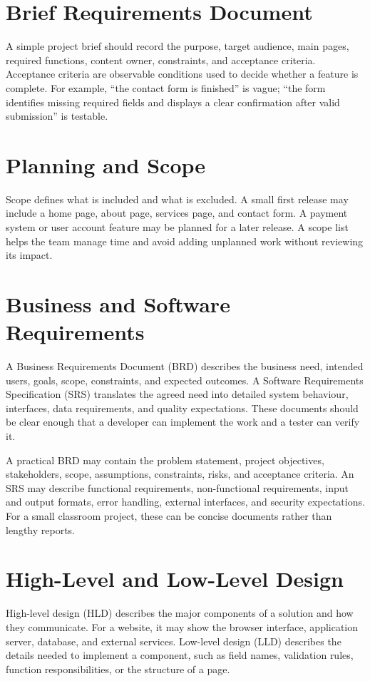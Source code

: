 \documentclass[11pt,openany,oneside]{book}
\begin{document}
\section{Brief Requirements Document}
A simple project brief should record the purpose, target audience, main pages, required functions, content owner, constraints, and acceptance criteria. Acceptance criteria are observable conditions used to decide whether a feature is complete. For example, “the contact form is finished” is vague; “the form identifies missing required fields and displays a clear confirmation after valid submission” is testable.

\section{Planning and Scope}
Scope defines what is included and what is excluded. A small first release may include a home page, about page, services page, and contact form. A payment system or user account feature may be planned for a later release. A scope list helps the team manage time and avoid adding unplanned work without reviewing its impact.


\section{Business and Software Requirements}
A Business Requirements Document (BRD) describes the business need, intended users, goals, scope, constraints, and expected outcomes. A Software Requirements Specification (SRS) translates the agreed need into detailed system behaviour, interfaces, data requirements, and quality expectations. These documents should be clear enough that a developer can implement the work and a tester can verify it.

A practical BRD may contain the problem statement, project objectives, stakeholders, scope, assumptions, constraints, risks, and acceptance criteria. An SRS may describe functional requirements, non-functional requirements, input and output formats, error handling, external interfaces, and security expectations. For a small classroom project, these can be concise documents rather than lengthy reports.

\section{High-Level and Low-Level Design}
High-level design (HLD) describes the major components of a solution and how they communicate. For a website, it may show the browser interface, application server, database, and external services. Low-level design (LLD) describes the details needed to implement a component, such as field names, validation rules, function responsibilities, or the structure of a page.
\end{document}
